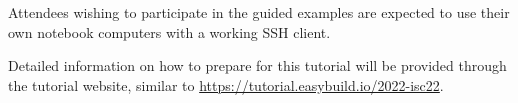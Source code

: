 Attendees wishing to participate in the guided examples are expected to use their
own notebook computers with a working SSH client.

Detailed information on how to prepare for this tutorial will be provided
through the tutorial website, similar to
\url{https://tutorial.easybuild.io/2022-isc22}.
